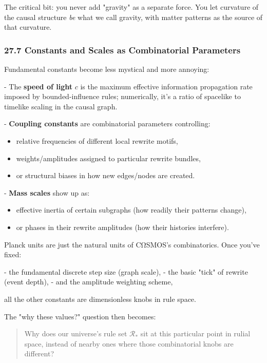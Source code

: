 The critical bit: you never add "gravity" as a separate force. You let curvature of the causal structure \emph{be} what we call gravity, with matter patterns as the source of that curvature.

\subsubsection*{27.7  Constants and Scales as Combinatorial Parameters}

Fundamental constants become less mystical and more annoying:

- The \textbf{speed of light} $c$ is the maximum effective information propagation rate imposed by bounded-influence rules; numerically, it’s a ratio of spacelike to timelike scaling in the causal graph.

- \textbf{Coupling constants} are combinatorial parameters controlling:
  \begin{itemize}
    \item relative frequencies of different local rewrite motifs,
    \item weights/amplitudes assigned to particular rewrite bundles,
    \item or structural biases in how new edges/nodes are created.
  \end{itemize}

- \textbf{Mass scales} show up as:
  \begin{itemize}
    \item effective inertia of certain subgraphs (how readily their patterns change),
    \item or phases in their rewrite amplitudes (how their histories interfere).
  \end{itemize}

Planck units are just the natural units of CΩSMOS’s combinatorics. Once you’ve fixed:

- the fundamental discrete step size (graph scale),
- the basic "tick" of rewrite (event depth),
- and the amplitude weighting scheme,

all the other constants are dimensionless knobs in rule space.

The "why these values?" question then becomes:

\begin{quote}
Why does our universe’s rule set $\mathcal{R}_\ast$ sit at this particular point in rulial space, instead of nearby ones where those combinatorial knobs are different?
\end{quote}

